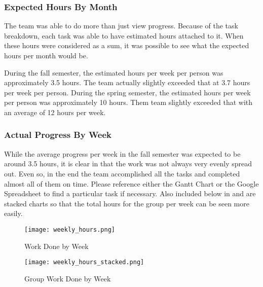 \documentclass[PPFS.tex]{template/subfiles}
\begin{document}
\subsubsection{Expected Hours By Month}
The team was able to do more than just view progress. Because of the task breakdown, each task was able to have estimated hours attached to it. When these hours were considered as a sum, it was possible to see what the expected hours per month would be.

During the fall semester, the estimated hours per week per person was approximately 3.5 hours. The team actually slightly exceeded that at 3.7 hours per week per person. During the spring semester, the estimated hours per week per person was approximately 10 hours. Them team slightly exceeded that with an average of 12 hours per week.

\subsubsection{Actual Progress By Week}

While the average progress per week in the fall semester was expected to be around 3.5 hours, it is clear in  that the work was not always very evenly spread out. Even so, in the end the team accomplished all the tasks and completed almost all of them on time. Please reference either the Gantt Chart or the Google Spreadsheet to find a particular task if necessary. Also included below in  and  are stacked charts so that the total hours for the group per week can be seen more easily.

\begin{figure}[H]
    \centering
    \texttt{[image: weekly\_hours.png]}
    \caption{Work Done by Week}
    \label{fig:groupHours}
\end{figure}

\begin{figure}[H]
    \centering
    \texttt{[image: weekly\_hours\_stacked.png]}
    \caption{Group Work Done by Week}
    \label{fig:groupHoursStacked}
\end{figure}
\end{document}

